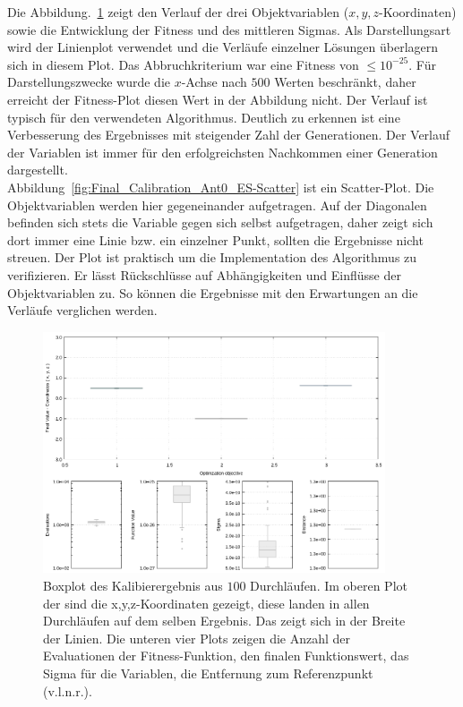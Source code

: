 Die Abbildung.~\ref{fig:Final_Calibration_Ant0_ES-boxes} zeigt den Verlauf der drei Objektvariablen ($x,y,z$-Koordinaten) sowie die Entwicklung der Fitness und des mittleren Sigmas. Als Darstellungsart wird der Linienplot verwendet und die Verläufe einzelner Lösungen überlagern sich in diesem Plot. Das Abbruchkriterium war eine Fitness von $\leq 10^{-25}$. Für Darstellungszwecke wurde die $x$-Achse nach $500$ Werten beschränkt, daher erreicht der Fitness-Plot diesen Wert in der Abbildung nicht. Der Verlauf ist typisch für den verwendeten Algorithmus. Deutlich zu erkennen ist eine Verbesserung des Ergebnisses mit steigender Zahl der Generationen. Der Verlauf der Variablen ist immer für den erfolgreichsten Nachkommen einer Generation dargestellt.\\
%

Abbildung~\ref{fig:Final_Calibration_Ant0_ES-Scatter} ist ein Scatter-Plot. Die Objektvariablen werden hier gegeneinander aufgetragen. Auf der Diagonalen befinden sich stets die Variable gegen sich selbst aufgetragen, daher zeigt sich dort immer eine Linie bzw. ein einzelner Punkt, sollten die Ergebnisse nicht streuen. Der Plot ist praktisch um die Implementation des Algorithmus zu verifizieren. Er lässt Rückschlüsse auf Abhängigkeiten und Einflüsse der Objektvariablen zu. So können die Ergebnisse mit den Erwartungen an die Verläufe verglichen werden.\\
%
%
\begin{figure}[!ht]
  \begin{center}
    \includegraphics[width=0.9\textwidth]{img/calibration/calibration_ant0-boxes.png}
  \end{center}
  \caption[Box-Plot der Endergebnisse der Kalibierung]{Boxplot des Kalibierergebnis aus $100$ Durchläufen. Im oberen Plot der sind die x,y,z-Koordinaten gezeigt, diese landen in allen Durchläufen auf dem selben Ergebnis. Das zeigt sich in der Breite der Linien. Die unteren vier Plots zeigen die Anzahl der Evaluationen der Fitness-Funktion, den finalen Funktionswert, das Sigma für die Variablen, die Entfernung zum Referenzpunkt (v.l.n.r.).}
  \label{fig:Final_Calibration_Ant0_ES-boxes}
%
\end{figure}
